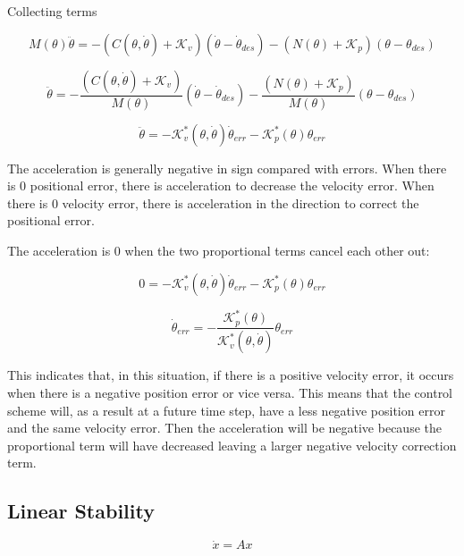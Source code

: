 \documentclass[12pt, letterpaper, oneside, notitlepage, onecolumn]{article}
\newcommand{\bbss}[1]{\subsection{#1}}
\begin{document}
Collecting terms

\begin{equation}
M(\theta) \ddot{\theta}
= 
-(C(\theta, \dot{\theta})
+ \mathcal{K}_{v}) (\dot{\theta} - \dot{\theta}_{des})
- (N(\theta)
+ \mathcal{K}_{p}) (\theta - \theta_{des})
\end{equation}

\begin{equation}
\ddot{\theta}
= 
-\dfrac{(C(\theta, \dot{\theta})
+ \mathcal{K}_{v})}{M(\theta)}
(\dot{\theta} - \dot{\theta}_{des})
-\dfrac{(N(\theta)
+ \mathcal{K}_{p})}{M(\theta)} (\theta - \theta_{des})
\end{equation}

\begin{equation}
\ddot{\theta}
= 
-\mathcal{K}_{v}^{*}(\theta, \dot{\theta})
\dot{\theta}_{err}
-\mathcal{K}_{p}^{*}(\theta)
\theta_{err}
\end{equation}

The acceleration is generally negative in sign compared with errors. When there
is 0 positional error, there is acceleration to decrease the velocity error.
When there is 0 velocity error, there is acceleration in the direction to
correct the positional error.

The acceleration is 0 when the two proportional terms cancel each other out:

\begin{equation}
0
= 
-\mathcal{K}_{v}^{*}(\theta, \dot{\theta})
\dot{\theta}_{err}
-\mathcal{K}_{p}^{*}(\theta)
\theta_{err}
\end{equation}

\begin{equation}
\dot{\theta}_{err}
= 
-\dfrac{\mathcal{K}_{p}^{*}(\theta)}{\mathcal{K}_{v}^{*}(\theta, \dot{\theta})}
\theta_{err}
\end{equation}

This indicates that, in this situation, if there is a positive velocity error, 
it occurs when there is a negative position error or vice versa. This means that
the control scheme will, as a result at a future time step, have a less negative
position error and the same velocity error. Then the acceleration will be
negative because the proportional term will have decreased leaving a larger
negative velocity correction term.


\bbss{Linear Stability}

\begin{equation}
\dot{x} = Ax
\end{equation}
\end{document}
